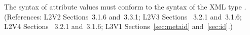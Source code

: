 The syntax of  attribute values must conform to the syntax of the
XML type .  (References: L2V2 Sections~3.1.6 and~3.3.1;
L2V3 Sections ~3.2.1 and~3.1.6; L2V4 Sections ~3.2.1 and~3.1.6; L3V1 
Sections~\ref{sec:metaid} and~\ref{sec:id}.)
